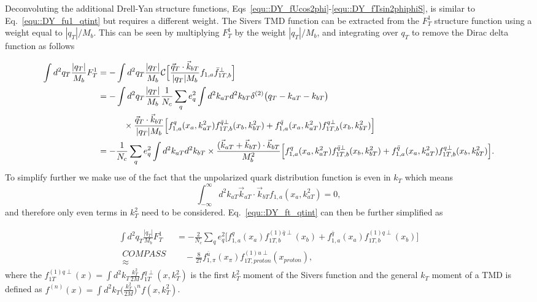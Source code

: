 Deconvoluting the additional Drell-Yan structure functions,
Eqs~\ref{equ::DY_fUcos2phi}-\ref{equ::DY_fTsin2phiphiS}, is similar to
Eq.~\ref{equ::DY_fu1_qtint} but requires a different weight.  The Sivers TMD
function can be extracted from the $F_T^1$ structure function using a weight
equal to $|q_T|/M_b$.  This can be seen by multiplying $F_T^1$ by the weight
$|q_T|/M_b$, and integrating over $q_T$ to remove the Dirac delta function as
follows

\begin{align}
  \label{equ::DY_ft_qtint}
  \int d^2{q_T} \frac{|q_T|}{M_b} F_T^1 &=
  - \int d^2{q_T} \frac{|q_T|}{M_b} {\cal C}
  \Big[\frac{\vec{q}_T \cdot \vec{k}_{bT}} {|q_T|M_{b}}  
  f_{1,a}  \bar{f}_{1T,b}^{\perp} \Big]
  \\ \nonumber
  &= - \int d^2{q_T} \frac{|q_T|}{M_b}
  \frac{1}{N_c} \sum_q e_q^2 \int d^2 k_{aT} d^2 k_{bT} 
  \delta^{(2)}\bigl(q_T - k_{aT} - k_{bT} \bigr)
  \\ \nonumber
  & \quad\quad\quad
  \times \frac{\vec{q}_T \cdot \vec{k}_{bT}} {|q_T|M_{b}}
  \Big[ f_{1,a}^q(x_a,k_{aT}^2)f_{1T,b}^{\bar{q}\perp}(x_b,k_{bT}^2) +
    f_{1,a}^{\bar{q}}(x_a,k_{aT}^2)f_{1T,b}^{q\perp}(x_b,k_{bT}^2) \Big]
  \\ \nonumber
  &= - \frac{1}{N_c} \sum_q e_q^2 \int d^2 k_{aT} d^2 k_{bT} 
  \times \frac{(\vec{k}_{aT} + \vec{k}_{bT}) \cdot \vec{k}_{bT}} {M^2_{b}}
  \Big[ f_{1,a}^q(x_a,k_{aT}^2)f_{1T,b}^{\bar{q}\perp}(x_b,k_{bT}^2) +
    f_{1,a}^{\bar{q}}(x_a,k_{aT}^2)f_{1T,b}^{q\perp}(x_b,k_{bT}^2) \Big].
\end{align}
\noindent
To simplify further we make use of the fact that the unpolarized quark
distribution function is even in $k_T$ which means
\begin{equation}
  \int_{-\infty}^{\infty} d^2 k_{aT} \vec{k}_{aT} \cdot \vec{k}_{bT}
  f_{1,a}(x_a, k_{aT}^2) = 0,
\end{equation}
\noindent
and therefore only even terms in $k_T^2$ need to be
considered. Eq.~\ref{equ::DY_ft_qtint} can then be further simplified as

\begin{align}
  \int d^2{q_T} \frac{|q_T|}{M_b} F_T^1 &=
  - \frac{2}{N_c} \sum_q e_q^2
  \Big[ f_{1,a}^q(x_a) f_{1T,b}^{(1)\bar{q}\perp}(x_b) +
    f_{1,a}^{\bar{q}}(x_a) f_{1T,b}^{(1)q\perp}(x_b) \Big]
  \\ \nonumber
  \substack{COMPASS \\ \approx}& \quad
  - \frac{8}{27}
  f_{1,\pi}^{\bar{u}}(x_\pi)f_{1T,proton}^{(1)u\perp}(x_{proton}),
\end{align}
\noindent
where the $f_{1T}^{(1)q\perp}(x) = \int d^2 k_{T}
\frac{k_T^2}{2M}f_{1T}^{q\perp}(x, k_T^2)$ is the first $k_T^2$ moment of the
Sivers function and the general $k_T$ moment of a TMD is defined as $f^{(n)}(x)
= \int d^2 k_{T} \Big(\frac{k_T^2}{2M}\Big)^nf(x, k_T^2)$.

